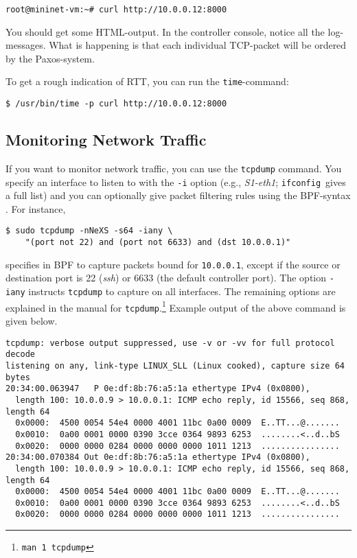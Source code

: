 \begin{Verbatim}
root@mininet-vm:~# curl http://10.0.0.12:8000
\end{Verbatim}

You should get some HTML-output.  In the controller console, notice
all the log-messages.  What is happening is that each individual
\acs{TCP}-packet will be ordered by the Paxos-system.

To get a rough indication of \acf{RTT}, you can run the \texttt{time}-command:

\begin{Verbatim}
$ /usr/bin/time -p curl http://10.0.0.12:8000
\end{Verbatim}

\subsection{Monitoring Network Traffic}
\label{chapter:tcpdump}

If you want to monitor network traffic, you can use the
\texttt{tcpdump}
command.  You specify an interface to listen to with the
\texttt{-i} option (e.g., \textit{S1-eth1};
\texttt{ifconfig} gives a full list) and you can
optionally give packet filtering rules using the
\acf{BPF}-syntax \cite{McCanne:1993:BPF:1267303.1267305}.  For instance,

\begin{Verbatim}
$ sudo tcpdump -nNeXS -s64 -iany \
    "(port not 22) and (port not 6633) and (dst 10.0.0.1)"
\end{Verbatim}

specifies in \acs{BPF} to capture packets bound for \texttt{10.0.0.1},
except if the source or destination port is 22
(\textit{ssh}) or 6633\index{controller!traffic
monitoring} (the default
controller port).  The option \texttt{-iany} instructs \texttt{tcpdump} to
capture on all interfaces.  The remaining options are explained in the
manual for \texttt{tcpdump}.\footnote{\texttt{man 1 tcpdump}}
Example output of the above command is given below.

\begin{Verbatim}[fontsize=\footnotesize]
tcpdump: verbose output suppressed, use -v or -vv for full protocol decode
listening on any, link-type LINUX_SLL (Linux cooked), capture size 64 bytes
20:34:00.063947   P 0e:df:8b:76:a5:1a ethertype IPv4 (0x0800), 
  length 100: 10.0.0.9 > 10.0.0.1: ICMP echo reply, id 15566, seq 868, length 64
  0x0000:  4500 0054 54e4 0000 4001 11bc 0a00 0009  E..TT...@.......
  0x0010:  0a00 0001 0000 0390 3cce 0364 9893 6253  ........<..d..bS
  0x0020:  0000 0000 0284 0000 0000 0000 1011 1213  ................
20:34:00.070384 Out 0e:df:8b:76:a5:1a ethertype IPv4 (0x0800), 
  length 100: 10.0.0.9 > 10.0.0.1: ICMP echo reply, id 15566, seq 868, length 64
  0x0000:  4500 0054 54e4 0000 4001 11bc 0a00 0009  E..TT...@.......
  0x0010:  0a00 0001 0000 0390 3cce 0364 9893 6253  ........<..d..bS
  0x0020:  0000 0000 0284 0000 0000 0000 1011 1213  ................
\end{Verbatim}

